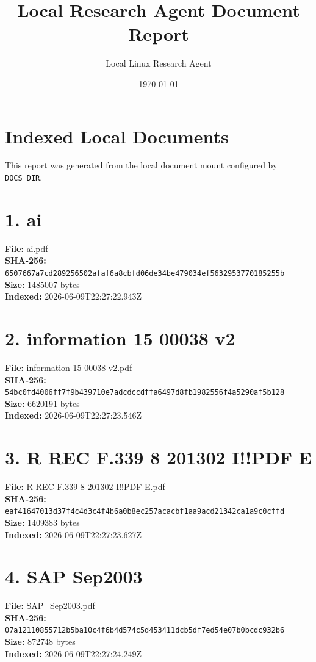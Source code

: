 \documentclass[11pt,a4paper]{article}
\title{Local Research Agent Document Report}
\author{Local Linux Research Agent}
\date{\today}
\begin{document}
\maketitle

\section*{Indexed Local Documents}
This report was generated from the local document mount configured by \texttt{DOCS\_DIR}.

\section*{1. ai}
\textbf{File:} ai.pdf\\
\textbf{SHA-256:} \texttt{6507667a7cd289256502afaf6a8cbfd06de34be479034ef5632953770185255b}\\
\textbf{Size:} 1485007 bytes\\
\textbf{Indexed:} 2026-06-09T22:27:22.943Z

\section*{2. information 15 00038 v2}
\textbf{File:} information-15-00038-v2.pdf\\
\textbf{SHA-256:} \texttt{54bc0fd4006ff7f9b439710e7adcdccdffa6497d8fb1982556f4a5290af5b128}\\
\textbf{Size:} 6620191 bytes\\
\textbf{Indexed:} 2026-06-09T22:27:23.546Z

\section*{3. R REC F.339 8 201302 I!!PDF E}
\textbf{File:} R-REC-F.339-8-201302-I!!PDF-E.pdf\\
\textbf{SHA-256:} \texttt{eaf41647013d37f4c4d3c4f4b6a0b8ec257acacbf1aa9acd21342ca1a9c0cffd}\\
\textbf{Size:} 1409383 bytes\\
\textbf{Indexed:} 2026-06-09T22:27:23.627Z

\section*{4. SAP Sep2003}
\textbf{File:} SAP\_Sep2003.pdf\\
\textbf{SHA-256:} \texttt{07a12110855712b5ba10c4f6b4d574c5d453411dcb5df7ed54e07b0bcdc932b6}\\
\textbf{Size:} 872748 bytes\\
\textbf{Indexed:} 2026-06-09T22:27:24.249Z
\end{document}

